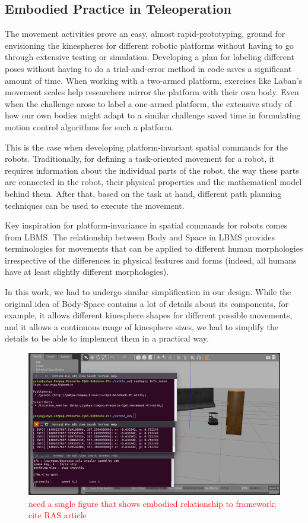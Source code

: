 \documentclass[arts,article,submit,moreauthors,pdftex,10pt,a4paper]{mdpi}
\begin{document}
\subsection{Embodied Practice in Teleoperation}

The movement activities prove an easy, almost rapid-prototyping, ground for envisioning the kinespheres for different robotic platforms without having to go through extensive testing or simulation. Developing a plan for labeling different poses without having to do a trial-and-error method in code saves a significant amount of time.  When working with a two-armed platform, exercises like Laban's movement scales help researchers mirror the platform with their own body. Even when the challenge arose to label a one-armed platform, the extensive study of how our own bodies might adapt to a similar challenge saved time in formulating motion control algorithms for such a platform.
	
This is the case when developing platform-invariant spatial commands for the robots. Traditionally, for defining a task-oriented movement for a robot, it requires information about the individual parts of the robot, the way these parts are connected in the robot, their physical properties and the mathematical model behind them. After that, based on the task at hand, different path planning techniques can be used to execute the movement. 

Key inspiration for platform-invariance in spatial commands for robots comes from LBMS. The relationship between Body and Space in LBMS provides terminologies for movements that can be applied to different human morphologies irrespective of the differences in physical features and forms (indeed, all humans have at least slightly different morphologies). 

In this work, we had to undergo similar simplification in our design. While the original idea of Body-Space contains a lot of details about its components, for example, it allows different kinesphere shapes for different possible movements, and it allows a continuous range of kinesphere sizes, we had to simplify the details to be able to implement them in a practical way.  

\begin{figure}[h!]
\centering
\vspace{-.1in}
\includegraphics[width=.65\columnwidth]{alli1}
\caption{\textcolor{red}{need a single figure that shows embodied relationship to framework; cite RAS article}}
\label{alli1}
\end{figure}
\end{document}
